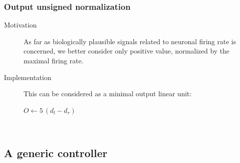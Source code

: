 \documentclass[a4]{article} \usepackage[left=2cm,right=3cm,top=1cm,bottom=2cm]{geometry}
\newcommand{\eqline}[1]{~\vspace{0.1cm}\\\centerline{$#1$}\vspace{0.1cm}\\}
\begin{document}
\subsubsection{Output unsigned normalization}\begin{description}
  \item[Motivation] As far as biologically plausible signals related to neuronal firing rate is concerned, we better consider only positive value, normalized by the maximal firing rate.
  \item[Implementation] This can be considered as a minimal output linear unit: \eqline{O \leftarrow 5 \, (d_l - d_r)}
\end{description}

\subsection{A generic controller}
\end{document}
